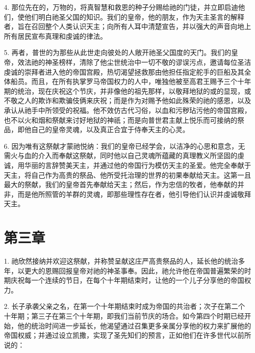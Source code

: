 4. 那位先在的，万物的，将真智慧和救恩的种子分赐给祂的门徒，并立即启迪他们，使他们明白祂圣父国的知识。我们的皇帝，他的朋友，作为天主圣言的解释者，旨在召回整个人类认识天主；向所有人耳中清楚宣告，并以强大的声音向地上所有居民宣布真理和虔诚的律法。\par

5. 再者，普世的为那些从此世走向彼处的人敞开祂圣父国度的天门。我们的皇帝，效法祂的神圣榜样，清除了他尘世统治中一切不敬的谬误污点，邀请每位圣洁虔诚的崇拜者进入他的帝国宫殿，热切渴望拯救那由他担任指定舵手的巨船及其全体船员。而且，在所有执掌罗马帝国权力的人中，唯独他被至高君王赐予三个十年期的统治，现在庆祝这个节庆，并非像他的祖先那样，以敬拜地狱的或的显现，或不敬之人的欺诈和欺骗伎俩来庆祝；而是作为对赐予他如此殊荣的祂的感恩，以及承认从祂手中所领受的祝福。他不效仿古代习俗，以血和污秽玷污他的帝国宫殿，也不以火和烟和祭献来讨好地狱的神祇；而是向普世君主献上悦乐而可接纳的祭品，即他自己的皇帝灵魂，以及真正合宜于侍奉天主的心灵。\par

6. 因为唯有这祭献才蒙祂悦纳：我们的皇帝已经学会，以洁净的心思和意念，无需火与血的介入而奉献这祭献，同时他以自己灵魂所蕴藏的真理教义所坚固的虔诚，用华丽的言辞赞美天主，并通过他的帝国行为模仿天主的圣爱。他完全奉献于天主，将自己作为高贵的祭品、他所受托治理的世界的初果奉献给天主。这第一且最大的祭献，我们的皇帝首先奉献给天主；然后，作为忠信的牧者，他奉献的并非，而是他所照管的羊群的灵魂，即那些理性存在者，他引导他们认识并虔诚敬拜天主。\par


\section{第三章}

1. 祂欣然接纳并欢迎这祭献，并称赞呈献这庄严高贵祭品的人，延长他的统治多年，以更大的恩赐回报皇帝对祂的神圣事奉。因此，祂允许他在帝国普遍繁荣的时期庆祝每一个连续的节日，在每个十年期结束时，让他的一个儿子分享他的帝国权力。\par

2. 长子承袭父亲之名，在第一个十年期结束时成为帝国的共治者；次子在第二个十年期；第三子在第三个十年期，即我们当前节庆的场合。如今第四个时期已经开始，他的统治时间进一步延长，他渴望通过召集更多亲属分享他的权力来扩展他的帝国权威；并通过设立凯撒，实现了圣先知们的预言，正如他们在许多世代以前所说的：\par

